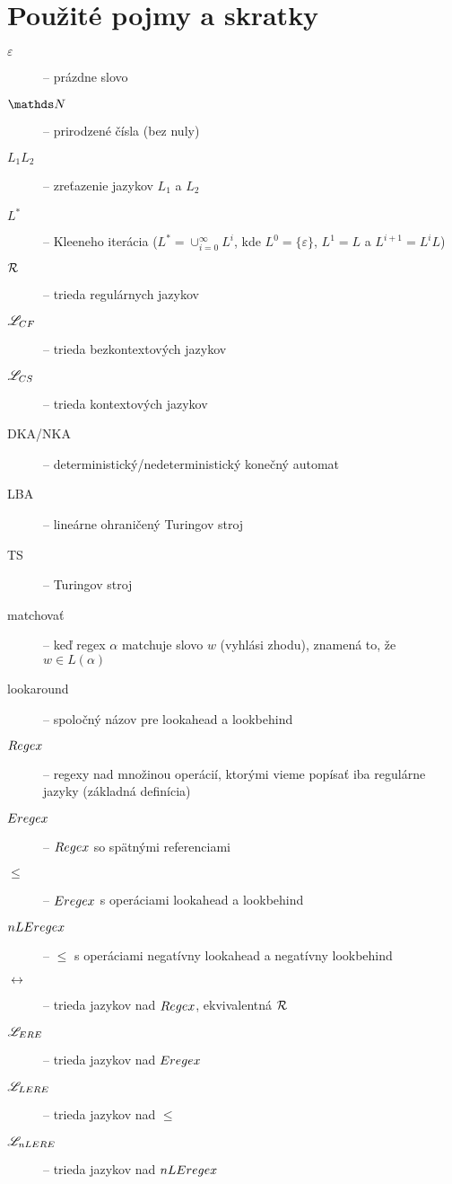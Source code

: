 \chapter*{Použité pojmy a skratky}
\label{chap:pojmy}
{}

\begin{description}
\item[$\varepsilon$] -- prázdne slovo
\item[$\N$] -- prirodzené čísla (bez nuly)
\item[$ L_{1}L_{2} $] -- zreťazenie jazykov $ L_{1} $ a $ L_{2} $
\item[$ L^* $] -- Kleeneho iterácia ($L^*=\cup^{\infty}_{i=0}L^i$, kde $L^0=\lbrace \varepsilon \rbrace$, $L^1=L$ a $L^{i+1}=L^iL$)
\item[$ {\cal R} $] -- trieda regulárnych jazykov
\item[$ \mathscr{L}_{CF}$] -- trieda bezkontextových jazykov
\item[$ \mathscr{L}_{CS}$] -- trieda kontextových jazykov
\item[DKA/NKA] -- deterministický/nedeterministický konečný automat
\item[LBA] -- lineárne ohraničený Turingov stroj
\item[TS] -- Turingov stroj
\item[matchovať] -- keď regex $\alpha$ matchuje slovo $w$ (vyhlási zhodu), znamená to, že $w\in L(\alpha)$
\item[lookaround] -- spoločný názov pre lookahead a lookbehind

\item[$Regex$] -- regexy nad množinou operácií, ktorými vieme popísať iba regulárne jazyky (základná definícia)
\item[$Eregex$] -- $Regex$ so spätnými referenciami
\item[$\le$] -- $Eregex$ s operáciami lookahead a lookbehind
\item[$nLEregex$] -- $\le$ s operáciami negatívny lookahead a negatívny lookbehind
\item[$\rel$] -- trieda jazykov nad $Regex$, ekvivalentná ${\cal R}$
\item[$\mathscr{L}_{ERE}$] -- trieda jazykov nad $Eregex$
\item[$\mathscr{L}_{LERE}$] -- trieda jazykov nad $\le$
\item[$\mathscr{L}_{nLERE}$] -- trieda jazykov nad $nLEregex$
\end{description}